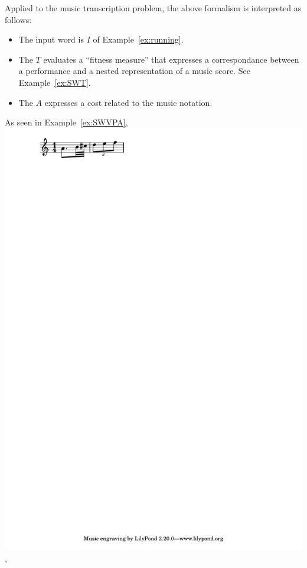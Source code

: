 \begin{example}
Applied to the music transcription problem, the above formalism
is interpreted as follows:
%
\begin{itemize}
\item The input word is $I$ of Example~\ref{ex:running}.
\item The \SWT $T$ evaluates a ``fitness measure''  that expresses
    a correspondance between a performance and a nested representation of a music score.
    See Example~\ref{ex:SWT}.
\item The \SWVPA $A$ expresses a cost related to the music notation.
\end{itemize}
%
As seen in Example~\ref{ex:SWVPA},
\includegraphics[scale=0.35,trim=0 5mm 0 0]{pictures/ex1.pdf},

\end{example}
